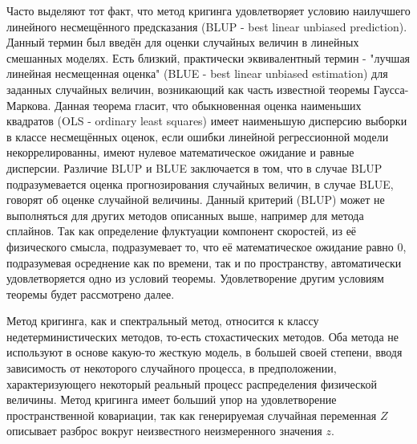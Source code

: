 Часто выделяют тот факт, что метод кригинга удовлетворяет условию наилучшего линейного несмещённого предсказания (BLUP - best linear unbiased prediction). Данный термин был введён для оценки случайных величин в линейных смешанных моделях. Есть близкий, практически эквивалентный термин - "лучшая линейная несмещенная оценка" (BLUE - best linear unbiased estimation) для заданных случайных величин, возникающий как часть известной теоремы Гаусса-Маркова\cite[с.~64]{Rasmussen}. Данная теорема гласит, что обыкновенная оценка наименьших квадратов (OLS - ordinary least squares) имеет наименьшую дисперсию выборки в классе несмещённых оценок, если ошибки линейной регрессионной модели некоррелированны, имеют нулевое математическое ожидание и равные дисперсии. Различие BLUP и BLUE заключается в том, что в случае BLUP подразумевается оценка прогнозирования случайных величин, в случае BLUE, говорят об оценке случайной величины. Данный критерий (BLUP) может не выполняться для других методов описанных выше, например для метода сплайнов. Так как определение флуктуации компонент скоростей, из её физического смысла, подразумевает то, что её математическое ожидание равно 0, подразумевая осреднение как по времени, так и по пространству, автоматически удовлетворяется одно из условий теоремы. Удовлетворение другим условиям теоремы будет рассмотрено далее. 

Метод кригинга, как и спектральный метод, относится к классу недетерминистических методов, то-есть стохастических методов. Оба метода не используют в основе какую-то жесткую модель, в большей своей степени, вводя зависимость от некоторого случайного процесса, в предположении, характеризующего некоторый реальный процесс распределения физической величины. Метод кригинга имеет больший упор на удовлетворение пространственной ковариации, так как генерируемая случайная переменная $Z$ описывает разброс вокруг неизвестного неизмеренного значения $z$. 

